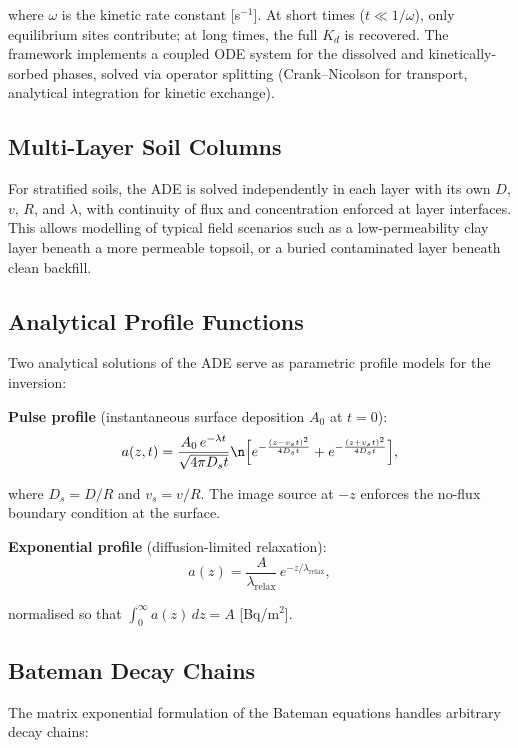 \documentclass[a4paper,11pt]{article}
\begin{document}
where $\omega$ is the kinetic rate constant [s$^{-1}$].  At short times
($t \ll 1/\omega$), only equilibrium sites contribute; at long times,
the full $K_d$ is recovered.  The framework implements a coupled
ODE system for the dissolved and kinetically-sorbed phases, solved via
operator splitting (Crank--Nicolson for transport, analytical integration
for kinetic exchange).

\subsection{Multi-Layer Soil Columns}

For stratified soils, the ADE is solved independently in each layer with
its own $D$, $v$, $R$, and $\lambda$, with continuity of flux and
concentration enforced at layer interfaces.  This allows modelling of
typical field scenarios such as a low-permeability clay layer beneath a
more permeable topsoil, or a buried contaminated layer beneath clean
backfill.

\subsection{Analytical Profile Functions}

Two analytical solutions of the ADE serve as parametric profile models
for the inversion:

\textbf{Pulse profile} (instantaneous surface deposition $A_0$ at $t = 0$):
\begin{equation}
  a(z,t) = \frac{A_0\,e^{-\lambda t}}{\sqrt{4\pi D_s t}}\n    \Bigl[e^{-\frac{(z - v_s t)^2}{4 D_s t}} + e^{-\frac{(z + v_s t)^2}{4 D_s t}}\Bigr],
\end{equation}

where $D_s = D/R$ and $v_s = v/R$.  The image source at $-z$ enforces
the no-flux boundary condition at the surface.

\textbf{Exponential profile} (diffusion-limited relaxation):
\begin{equation}
  a(z) = \frac{A}{\lambda_{\mathrm{relax}}}\,e^{-z/\lambda_{\mathrm{relax}}},
\end{equation}

normalised so that $\int_0^\infty a(z)\,dz = A$ [Bq/m$^2$].

\subsection{Bateman Decay Chains}

The matrix exponential formulation of the Bateman equations handles
arbitrary decay chains:
\end{document}
